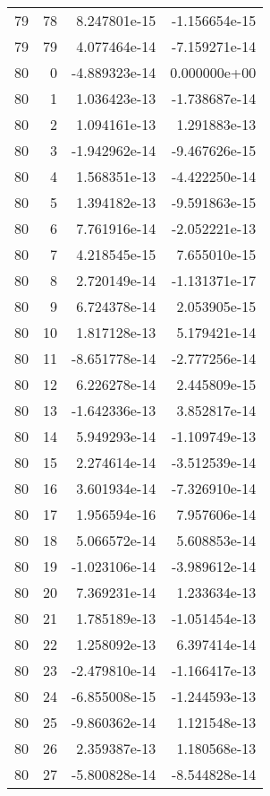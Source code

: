 \begin{tabular}{rrrr}
  79 &   78 &  8.247801e-15 & -1.156654e-15 \\
  79 &   79 &  4.077464e-14 & -7.159271e-14 \\
  80 &    0 & -4.889323e-14 &  0.000000e+00 \\
  80 &    1 &  1.036423e-13 & -1.738687e-14 \\
  80 &    2 &  1.094161e-13 &  1.291883e-13 \\
  80 &    3 & -1.942962e-14 & -9.467626e-15 \\
  80 &    4 &  1.568351e-13 & -4.422250e-14 \\
  80 &    5 &  1.394182e-13 & -9.591863e-15 \\
  80 &    6 &  7.761916e-14 & -2.052221e-13 \\
  80 &    7 &  4.218545e-15 &  7.655010e-15 \\
  80 &    8 &  2.720149e-14 & -1.131371e-17 \\
  80 &    9 &  6.724378e-14 &  2.053905e-15 \\
  80 &   10 &  1.817128e-13 &  5.179421e-14 \\
  80 &   11 & -8.651778e-14 & -2.777256e-14 \\
  80 &   12 &  6.226278e-14 &  2.445809e-15 \\
  80 &   13 & -1.642336e-13 &  3.852817e-14 \\
  80 &   14 &  5.949293e-14 & -1.109749e-13 \\
  80 &   15 &  2.274614e-14 & -3.512539e-14 \\
  80 &   16 &  3.601934e-14 & -7.326910e-14 \\
  80 &   17 &  1.956594e-16 &  7.957606e-14 \\
  80 &   18 &  5.066572e-14 &  5.608853e-14 \\
  80 &   19 & -1.023106e-14 & -3.989612e-14 \\
  80 &   20 &  7.369231e-14 &  1.233634e-13 \\
  80 &   21 &  1.785189e-13 & -1.051454e-13 \\
  80 &   22 &  1.258092e-13 &  6.397414e-14 \\
  80 &   23 & -2.479810e-14 & -1.166417e-13 \\
  80 &   24 & -6.855008e-15 & -1.244593e-13 \\
  80 &   25 & -9.860362e-14 &  1.121548e-13 \\
  80 &   26 &  2.359387e-13 &  1.180568e-13 \\
  80 &   27 & -5.800828e-14 & -8.544828e-14 \\

\end{tabular}
